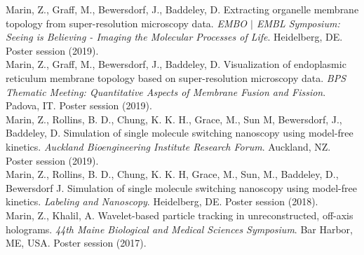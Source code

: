 {
Marin, Z., Graff, M., Bewersdorf, J., Baddeley, D. Extracting organelle membrane topology from super-resolution microscopy data. \emph{EMBO $|$ EMBL Symposium: Seeing is Believing - Imaging the Molecular Processes of Life}. Heidelberg, DE. Poster session (2019). \\

Marin, Z., Graff, M., Bewersdorf, J., Baddeley, D. Visualization of endoplasmic reticulum membrane topology based on super-resolution microscopy data. \emph{BPS Thematic Meeting: Quantitative Aspects of Membrane Fusion and Fission}. Padova, IT. Poster session (2019). \\

Marin, Z., Rollins, B. D., Chung, K. K. H., Grace, M., Sun M, Bewersdorf, J., Baddeley, D. Simulation of single molecule switching nanoscopy using model-free kinetics. \emph{Auckland Bioengineering Institute Research Forum}. Auckland, NZ. Poster session (2019). \\

Marin, Z., Rollins, B. D., Chung, K. K. H, Grace, M., Sun, M., Baddeley, D., Bewersdorf J. Simulation of single molecule switching nanoscopy using model-free kinetics. \emph{Labeling and Nanoscopy}. Heidelberg, DE. Poster session (2018). \\

Marin, Z., Khalil, A. Wavelet-based particle tracking in unreconstructed, off-axis holograms. \emph{44th Maine Biological and Medical Sciences Symposium}. Bar Harbor, ME, USA. Poster session (2017). \\
}

\vspace{11pt}
